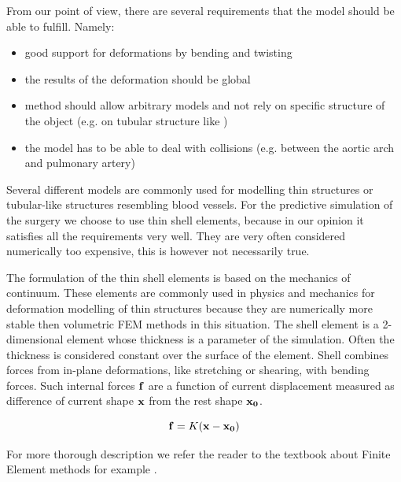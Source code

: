 From our point of view, there are several requirements that the model
should be able to fulfill. Namely:

\begin{itemize}
  \item good support for deformations by bending and twisting
  \item the results of the deformation should be global
  \item method should allow arbitrary models and not rely on specific
  structure of the object (e.g. on tubular structure like \cite{Li2009})
  \item the model has to be able to deal with collisions (e.g. between the
  aortic arch and pulmonary artery)
\end{itemize}

Several different models are commonly used for modelling thin structures or
tubular-like structures resembling blood vessels.  For the predictive simulation of the surgery we choose to use
thin shell elements, because in our opinion it satisfies all the
requirements very well. They are very often considered numerically too
expensive, this is however not necessarily true.


The formulation of the thin shell elements is based on the mechanics of
continuum. These elements are commonly used in physics and mechanics for
deformation modelling of thin structures because they are numerically more
stable then volumetric FEM methods in this situation. The shell element is
a 2-dimensional element whose thickness is a parameter of the simulation.
Often the thickness is considered constant over the surface of the element.
Shell combines forces from in-plane deformations, like stretching or shearing, with bending forces. 
Such internal forces $\mathbf{f}$ are a function of current displacement measured as difference of current shape
$\mathbf{x}$ from the rest shape $\mathbf{x_0}$.

\begin{equation}
  \mathbf{f} = K(\mathbf{x} - \mathbf{x_0})
 \label{linear_static_model} 
\end{equation}

For more thorough description we refer the reader to the textbook about
Finite Element methods for example \cite{Reddy1993}.


